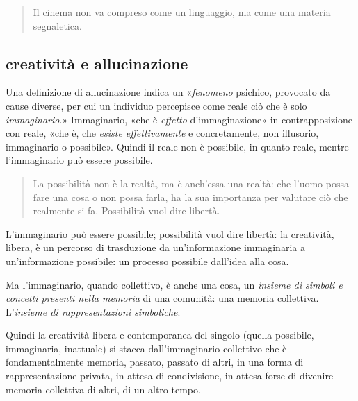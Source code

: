 \documentclass{../../lib/gs}
\begin{document}
\begin{quote}
\begin{sf}
\small
  Il cinema non va compreso come un linguaggio, ma come una materia segnaletica.
  \cite{deleuze2009}
  \end{sf}
\end{quote}


\subsection{creatività e allucinazione}

Una definizione di allucinazione indica un «\emph{fenomeno} psichico,
provocato da cause diverse, per cui un individuo percepisce come reale ciò che
è solo \emph{immaginario}.» Immaginario, «che è \emph{effetto} d'immaginazione»
in contrapposizione con reale, «che è, che \emph{esiste effettivamente} e
concretamente, non illusorio, immaginario o possibile». Quindi il reale non è
possibile, in quanto reale, mentre l'immaginario può essere possibile.

\begin{quote}
  La possibilità non è la realtà, ma è anch'essa una realtà: che l'uomo possa
  fare una cosa o non possa farla, ha la sua importanza per valutare ciò che
  realmente si fa. Possibilità vuol dire libertà. \cite{ag:matst}
\end{quote}%

L'immaginario può essere possibile; possibilità vuol dire libertà: la creatività,
libera, è un percorso di trasduzione da un'informazione immaginaria a
un'informazione possibile: un processo possibile dall'idea alla cosa.

Ma l'immaginario, quando collettivo, è anche una cosa, un \emph{insieme di
simboli e concetti presenti nella memoria} di una comunità: una memoria
collettiva. L'\emph{insieme di rappresentazioni simboliche}.

Quindi la creatività libera e contemporanea \cite{agamben08} del singolo
(quella possibile, immaginaria, inattuale) si stacca dall'immaginario collettivo
che è fondamentalmente memoria, passato, passato di altri, in una forma di
rappresentazione privata, in attesa di condivisione, in attesa forse di divenire
memoria collettiva di altri, di un altro tempo.
\end{document}
